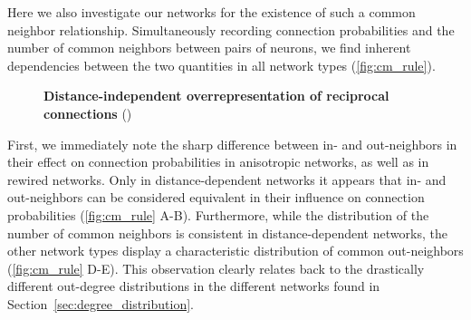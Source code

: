 Here we also investigate our networks for the existence of such a
common neighbor relationship. Simultaneously recording connection
probabilities and the number of common neighbors between pairs of
neurons, we find inherent dependencies between the two quantities in
all network types (\autoref{fig:cm_rule}). 


\begin{figure}[H]
  \centering
  \vfill
  \vspace{0.2cm}
  \vfill
  \vspace{0.2cm}
  \captionsetup{skip=7pt}
  \caption{\textbf{Distance-independent overrepresentation of
      reciprocal connections}  ()}
  \label{fig:cm_rule}
\end{figure}


First, we immediately note the sharp difference between in- and
out-neighbors in their effect on connection probabilities in
anisotropic networks, as well as in rewired networks. Only in
distance-dependent networks it appears that in- and out-neighbors can
be considered equivalent in their influence on connection
probabilities (\autoref{fig:cm_rule} A-B). Furthermore, while the
distribution of the number of common neighbors is consistent in
distance-dependent networks, the other network types display a
characteristic distribution of common out-neighbors
(\autoref{fig:cm_rule} D-E). This observation clearly relates back to
the drastically different out-degree distributions in the different
networks found in Section~\ref{sec:degree_distribution}.

